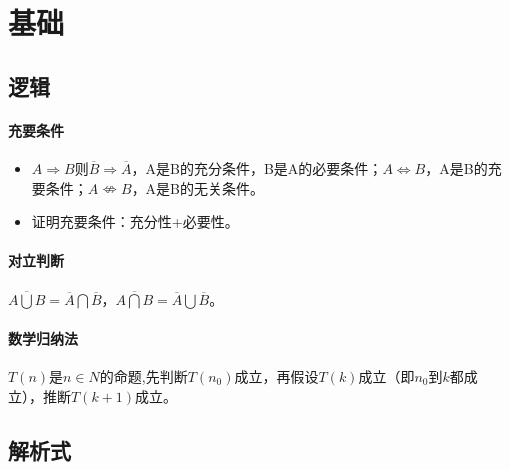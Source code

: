 \documentclass[
12pt, %
a4paper, 
oneside, %
headinclude,footinclude, %
]{scrartcl}
\title{\normalfont\spacedallcaps{数学}}
\date{}
\begin{document}
\maketitle
\newpage
\hypertarget{toc}{}
\begingroup
\begin{multicols}{2}
\tableofcontents
\end{multicols}
\endgroup
\newpage
\begingroup
\begin{multicols}{2}
\listoftips
\end{multicols}
\endgroup
\newpage
\section{基础}
\subsection[逻辑]{逻辑}
\paragraph{充要条件}
\begin{itemize}
\item $ A \Rightarrow B $则$ \overline{B} \Rightarrow \overline{A} $，A是B的充分条件，B是A的必要条件；$ A \Leftrightarrow B $，A是B的充要条件；$ A \nLeftrightarrow  B $，A是B的无关条件。
\item 证明充要条件：充分性+必要性。
\end{itemize}
\paragraph{对立判断}
$ \overline{A \bigcup B} = \overline{A} \bigcap \overline{B}$，$ \overline{A \bigcap B} = \overline{A} \bigcup \overline{B}$。
\paragraph{数学归纳法}
$ T(n) $是$ n \in N $的命题,先判断$ T(n_0) $成立，再假设$ T(k) $成立（即$ n_0 $到$ k $都成立），推断$ T(k+1) $成立。
\subsection[解析式]{解析式}
\end{document}
